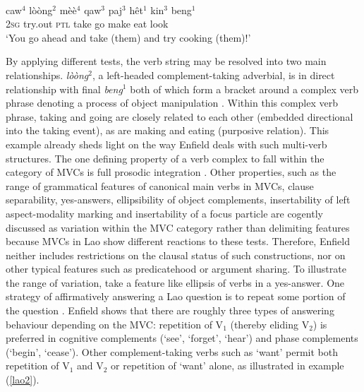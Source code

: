 \ea \label{lao1}
\\
\gll caw$^4$ lòòng$^2$ mèè$^4$ qaw$^3$ paj$^3$ hêt$^1$ kin$^3$ beng$^1$ \\
\textsc{2}\textsc{sg} try.out \textsc{ptl} take go make eat look \\
\glft `You go ahead and take (them) and try cooking (them)!'\\ 
\z

By applying different tests, the verb string may be resolved into two main relationships. \textit{lòòng$^2$}, a left-headed complement-taking adverbial, is in direct relationship with final \textit{beng$^1$} both of which form a bracket around a complex verb phrase denoting a process of object manipulation \citep[83]{enfield2008verbs}. Within this complex verb phrase, taking and going are closely related to each other (embedded directional into the taking event), as are making and eating (purposive relation). This example already sheds light on the way Enfield deals with such multi-verb structures. The one defining property of a verb complex to fall within the category of MVCs is full prosodic integration \citep[104]{enfield2008verbs}. Other properties, such as the range of grammatical features of canonical main verbs in MVCs, clause separability, yes-answers, ellipsibility of object complements, insertability of left aspect-modality marking and insertability of a focus particle are cogently discussed as variation within the MVC category rather than delimiting features because MVCs in Lao show different reactions to these tests. Therefore, Enfield neither includes restrictions on the clausal status of such constructions, nor on other typical features such as predicatehood or argument sharing. To illustrate the range of variation, take a feature like ellipsis of verbs in a yes-answer. One strategy of affirmatively answering a Lao question is to repeat some portion of the question \citep[106]{enfield2008verbs}. Enfield shows that there  are roughly three types of answering behaviour depending on the MVC: repetition of V$_1$ (thereby eliding V$_2$) is preferred in cognitive complements (`see', `forget', `hear') and phase complements (`begin', `cease'). Other complement-taking verbs such as `want' permit both repetition of  V$_1$ and V$_2$ or repetition of `want' alone, as illustrated in example (\ref{lao2}). 

